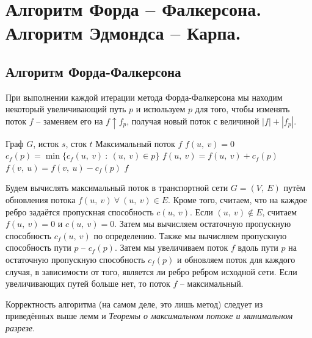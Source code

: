 \documentclass[a4paper,12pt]{article}
\begin{document}
\section{ Алгоритм Форда – Фалкерсона. Алгоритм Эдмондса – Карпа.}

\subsection{Алгоритм Форда-Фалкерсона}

При выполнении каждой итерации метода Форда-Фалкерсона мы находим некоторый увеличивающий путь $p$ и используем $p$ для того, чтобы изменять поток $f$ -- заменяем его на $f\uparrow f_p$, получая новый поток с величиной $|f| + |f_p|$.

\begin{algorithm}
  	\caption{($G = (V,\ E),\ s,\ t$)}
	\begin{algorithmic}
	    \Require Граф $G$, исток $s$, сток $t$
	    \Ensure Максимальный поток $f$
	    \State 
	        \State $f(u,\ v) = 0$
	    \EndFor
	        \State $c_f(p) = \min\{c_f(u,\ v)\ :\ (u,\ v) \in p\}$
	                \State $f(u,\ v) = f(u,\ v) + c_f(p)$
	            \Else
	                \State $f(v,\ u) = f(v,\ u) - c_f(p)$
	            \EndIf
	       \EndFor
	    \EndWhile
	    \State \Return $f$
	\end{algorithmic}
\end{algorithm}

Будем вычислять максимальный поток в транспортной сети $G = (V,\ E)$ путём обновления потока $f(u,\ v)\ \forall\ (u,\ v) \in E$. Кроме того, считаем, что на каждое ребро задаётся пропускная способность $c(u,\ v)$. Если $(u,\ v) \notin E$, считаем $f(u,\ v) = 0$ и $c(u,\ v) = 0$.  Затем мы вычисляем остаточную пропускную способность $c_f(u,\ v)$ по определению. Также мы вычисляем пропускную способность пути $p$ -- $c_f(p)$. Затем мы увеличиваем поток $f$ вдоль пути $p$ на остаточную пропускную способность $c_f(p)$ и обновляем поток для каждого случая, в зависимости от того, является ли ребро ребром исходной сети. Если увеличивающих путей больше нет, то поток $f$ -- максимальный.

Корректность алгоритма (на самом деле, это лишь метод) следует из приведённых выше лемм и \textit{Теоремы о максимальном потоке и минимальном разрезе}.
\end{document}
